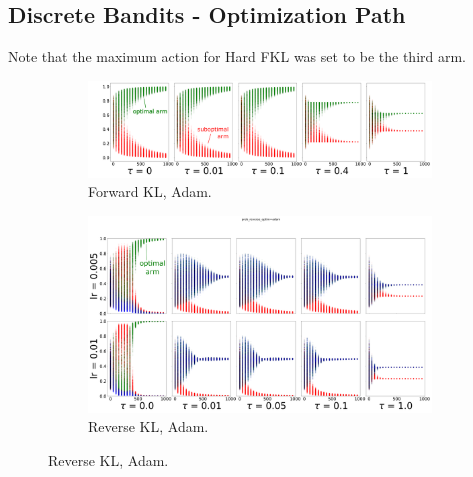 \documentclass{article}
\begin{document}
\subsection{Discrete Bandits - Optimization Path}\label{sec:discrete-bandit-plots}
Note that the maximum action for Hard FKL was set to be the third arm. 
\begin{figure}[!ht]
  \centering
  \begin{subfigure}[b]{0.4\linewidth}
    \centering
    \includegraphics[width=1\columnwidth]{figs/discrete-bandit/notlearnQ/adam/prob-adam.png}
    \caption{Forward KL, Adam.}
    \label{fig:discrete-bandit-prob-forward-adam}
  \end{subfigure}%
  \begin{subfigure}[b]{0.4\linewidth}
    \centering
    \includegraphics[width=1\columnwidth]{figs/discrete-bandit/notlearnQ/adam/prob-rev-adam.png}
    \caption{Reverse KL, Adam. }
    \label{fig:discrete-bandit-prob-reverse-adam}
  \end{subfigure}
  

\end{figure}
\end{document}
